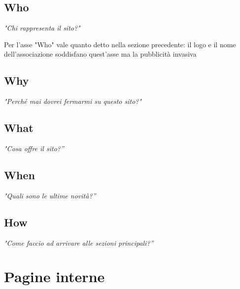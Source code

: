     \subsection{Who}
        \begin{center}
            \textit{"Chi rappresenta il sito?"}
        \end{center}
        Per l'asse "Who" vale quanto detto nella sezione precedente: il logo e il nome dell'associazione soddisfano quest'asse ma la pubblicità invasiva 

    \subsection{Why}
    \begin{center}
        \textit{"Perché mai dovrei fermarmi su questo sito?"}
    \end{center}

    \subsection{What}
    \begin{center}
        \textit{"Cosa offre il sito?”}
    \end{center}

    \subsection{When}
    \begin{center}
        \textit{"Quali sono le ultime novità?”}
    \end{center}

    \subsection{How}
    \begin{center}
        \textit{"Come faccio ad arrivare alle sezioni principali?”}
    \end{center}

\section{Pagine interne}
    
